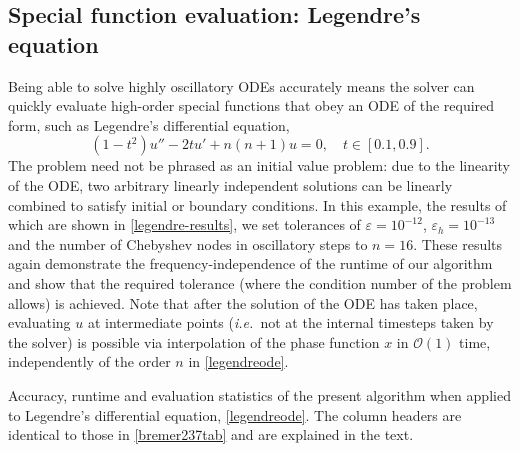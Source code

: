 \documentclass[10pt]{article}
\newcommand{\be}{\begin{equation}}
\newcommand{\ee}{\end{equation}}
\newcommand{\ie}{{\it i.e.\ }}
\newcommand{\bigO}{{\mathcal O}}
\begin{document}
\subsection{Special function evaluation: Legendre's equation}

Being able to solve highly oscillatory ODEs accurately means the solver can
quickly evaluate high-order special functions that obey an ODE of the required
form, such as Legendre's differential equation,
\be\label{legendreode}
(1-t^2)u'' - 2tu' + n(n+1)u = 0, \quad t \in [0.1, 0.9]. 
\ee
The problem need not be phrased as an initial value problem: due to the
linearity of the ODE, two arbitrary linearly independent solutions can be
linearly combined to satisfy initial or boundary conditions. In this example,
the results of which are shown in \cref{legendre-results}, we set tolerances of
$\varepsilon = 10^{-12}$, $\varepsilon_h = 10^{-13}$ and the number of
Chebyshev nodes in oscillatory steps to $n = 16$. 
These results again demonstrate the frequency-independence of the runtime of
our algorithm and show that the required tolerance (where the condition number
of the problem allows) is achieved. Note that after the solution of the ODE has
taken place, evaluating $u$ at intermediate points (\ie not at the internal
timesteps taken by the solver) is possible via interpolation of the phase
function $x$ in $\bigO(1)$ time, independently of the order $n$ in \cref{legendreode}.


\begin{table}
    \renewcommand{\arraystretch}{1.2}
    \resizebox{\textwidth}{!}{}
    \caption{Accuracy, runtime and evaluation statistics of the present algorithm when
    applied to Legendre's differential equation, \cref{legendreode}. The column
    headers are identical to those in \cref{bremer237tab} and are explained in
    the text. \label{legendre-results}}
\end{table}
\end{document}
